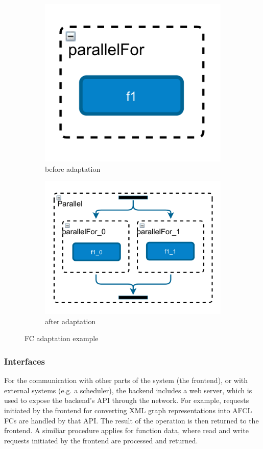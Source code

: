 \documentclass[a4paper,top=25mm,bottom=25mm,12pt,pdftex,halfparskip,twoside,openany,bibtotoc,numbers=noenddot]{scrbook}
\begin{document}
\begin{figure}[H]
\centering
\begin{subfigure}{.28\textwidth}
  \centering
  \includegraphics[width=.8\linewidth]{adaptation-before}
  \caption{before adaptation}
\end{subfigure}
\begin{subfigure}{.54\textwidth}
  \centering
  \includegraphics[width=.8\linewidth]{adaptation-after}
  \caption{after adaptation}
\end{subfigure}
\caption{FC adaptation example}
\label{fig:workflow-adaptation}
\end{figure}

\subsubsection{Interfaces}

For the communication with other parts of the system (the frontend), or with external systems (e.g. a scheduler), the backend includes a web server, which is used to expose the backend's API through the network. For example, requests initiated by the frontend for converting XML graph representations into AFCL FCs are handled by that API. The result of the operation is then returned to the frontend. A similiar procedure applies for function data, where read and write requests initiated by the frontend are processed and returned.
\end{document}
